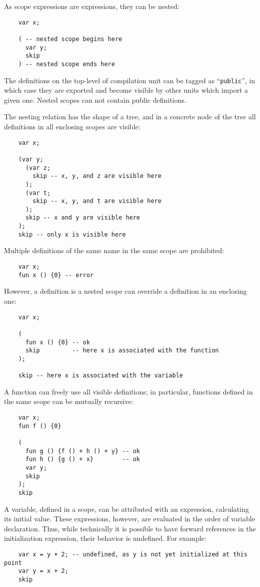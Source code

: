 As scope expressions are expressions, they can be nested:

\begin{lstlisting}
    var x;

    ( -- nested scope begins here
      var y;
      skip
    ) -- nested scope ends here
\end{lstlisting}

The definitions on the top-level of compilation unit can be tagged as ``\lstinline|public|'', in which case they are exported and become visible by
other units which import a given one. Nested scopes can not contain public definitions.

The nesting relation has the shape of a tree, and in a concrete node of the tree all definitions in all enclosing scopes are visible:

\begin{lstlisting}
    var x;

    (var y; 
      (var z;
        skip -- x, y, and z are visible here
      );
      (var t;
        skip -- x, y, and t are visible here
      );
      skip -- x and y are visible here
    );
    skip -- only x is visible here
\end{lstlisting}

Multiple definitions of the same name in the same scope are prohibited:

\begin{lstlisting}
    var x;
    fun x () {0} -- error
\end{lstlisting}

However, a definition is a nested scope can override a definition in an enclosing one:

\begin{lstlisting}
    var x;

    (
      fun x () {0} -- ok
      skip         -- here x is associated with the function
    );

    skip -- here x is associated with the variable
\end{lstlisting}

A function can freely use all visible definitions; in particular, functions defined in the
same scope can be mutually recursive:

\begin{lstlisting}
    var x;
    fun f () {0}

    ( 
      fun g () {f () + h () + y} -- ok
      fun h () {g () + x}        -- ok
      var y;
      skip
    );
    skip
\end{lstlisting}

A variable, defined in a scope, can be attributed with an expression, calculating its initial value.
These expressions, however, are evaluated in the order of variable declaration. Thus, while
technically it is possible to have forward references in the initialization expression, their
behavior is undefined. For example:

\begin{lstlisting}
    var x = y + 2; -- undefined, as y is not yet initialized at this point
    var y = x + 2;
    skip
\end{lstlisting}

